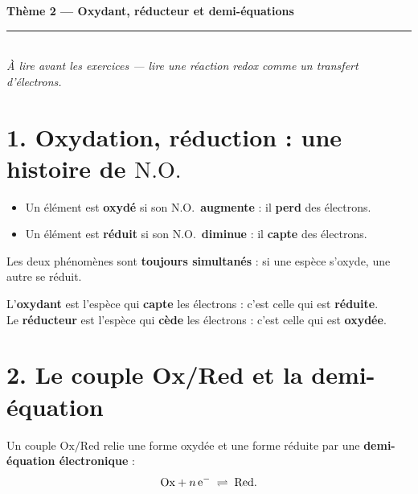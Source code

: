 \documentclass[11pt,a4paper]{article}
\newcommand{\NO}{\ensuremath{\mathrm{N.O.}}}
\begin{document}
\begin{center}
{\LARGE\bfseries\color{primarydark}Thème 2 — Oxydant, réducteur et demi-équations}\\[3pt]
{\color{primary}\rule{9cm}{1.2pt}}\\[4pt]
{\small\itshape À lire avant les exercices — lire une réaction redox comme un transfert d'électrons.}
\end{center}

\vspace{-2pt}
\section*{1. Oxydation, réduction : une histoire de \NO}
\begin{defi}
\begin{itemize}[leftmargin=1.5em,topsep=1pt,itemsep=1.5pt]
  \item Un élément est \textbf{oxydé} si son \NO\ \textbf{augmente} : il \textbf{perd} des électrons.
  \item Un élément est \textbf{réduit} si son \NO\ \textbf{diminue} : il \textbf{capte} des électrons.
\end{itemize}
Les deux phénomènes sont \textbf{toujours simultanés} : si une espèce s'oxyde, une autre se réduit.
\end{defi}

\begin{defi}
L'\textbf{\textcolor{oxcol}{oxydant}} est l'espèce qui \textbf{capte} les électrons : c'est celle qui
est \textbf{réduite}. \\
Le \textbf{\textcolor{redcol}{réducteur}} est l'espèce qui \textbf{cède} les électrons : c'est celle
qui est \textbf{oxydée}.
\end{defi}

\begin{center}
\small{}
\end{center}

\section*{2. Le couple Ox/Red et la demi-équation}
\begin{defi}
Un couple $\mathrm{Ox}/\mathrm{Red}$ relie une forme oxydée et une forme réduite par une
\textbf{demi-équation électronique} :
\[
\mathrm{Ox} + n\,\ce{e^-} \;\rightleftharpoons\; \mathrm{Red}.
\]
\end{defi}
\end{document}
